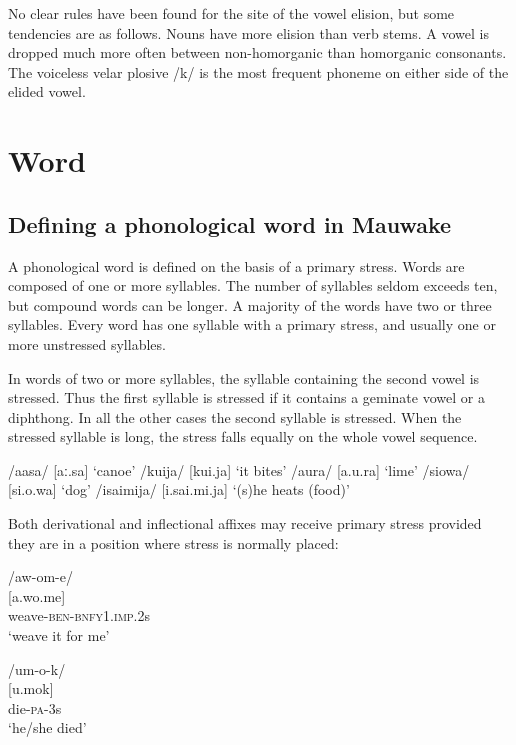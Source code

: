No clear rules have been found for the site of the vowel elision, but some tendencies are as follows. Nouns have more elision than verb stems. A vowel is dropped much more often between non-homorganic than homorganic consonants. The voiceless velar plosive /k/ is the most frequent phoneme on either side of the elided vowel.

\section{Word}\label{sec:2:x}

\subsection{Defining a phonological word in Mauwake}\label{sec:2:y:x}

A phonological word is defined on the basis of a primary stress. Words are composed of one or more syllables. The number of syllables seldom exceeds ten, but compound words can be longer. A majority of the words have two or three syllables.  Every word has one syllable with a primary stress, and usually one or more unstressed syllables. 

In words of two or more syllables, the syllable containing the second vowel is stressed. Thus the first syllable is stressed if it contains a geminate vowel or a diphthong. In all the other cases the second syllable is stressed. When the stressed syllable is long, the stress falls equally on the whole vowel sequence. 

\ea
\ea
/aasa/  [{{\textprimstress}aː.sa}]  `canoe'
\ex
/kuija/  [{{\textprimstress}kui.ja}]  `it bites'
\ex
/a{\textphi}ura/  [a.{{\textprimstress}}{\textphi}u.ra]  `lime'
\ex
/siowa/  [si.{{\textprimstress}o.wa}]  `dog'
\ex
/isaimija/  [i.{{\textprimstress}sai.mi.ja}]  `(s)he heats (food)'
\z
\z

Both derivational and inflectional affixes may receive primary stress provided they are in a position where stress is normally placed:

\ea
\ea
  /aw-om-e/\\
  {}[a.{{\textprimstress}wo.me}]  \\
weave-\textsc{ben}-\textsc{bnfy1}.\textsc{imp}.2s\\
\glt `weave it for me' 

\ex
  /um-o-k/ \\
 {}[u.{{\textprimstress}mok}]  \\
die-\textsc{pa}-3s \\
\glt `he/she died'
\z
\z



